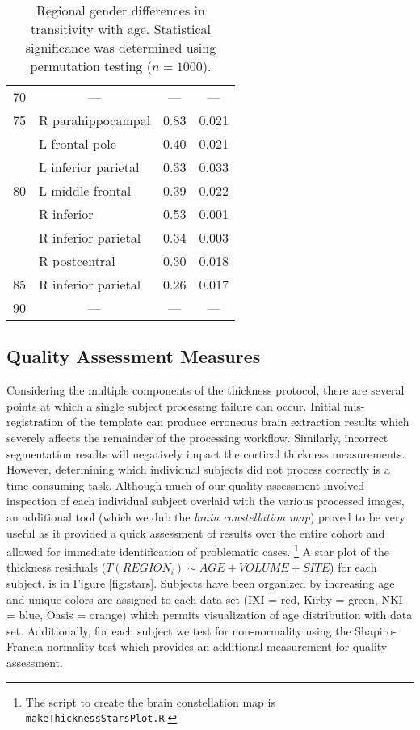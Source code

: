 \begin{table}[htb]
\begin{tabular}{c l c c}
\rowcolor{gray!40}
70 & \multicolumn{1}{c}{---} & --- & --- \\
\rowcolor{gray!20}
75 & R parahippocampal & 0.83 & 0.021 \\
\rowcolor{gray!20}
{} & L frontal pole & 0.40 & 0.021 \\
\rowcolor{gray!20}
{} & L inferior parietal & 0.33 & 0.033 \\
\rowcolor{gray!40}
80 & L middle frontal & 0.39 & 0.022 \\
\rowcolor{gray!40}
{} & R inferior & 0.53 & 0.001 \\
\rowcolor{gray!40}
{} & R inferior parietal & 0.34 & 0.003 \\
\rowcolor{gray!40}
{} & R postcentral & 0.30 & 0.018 \\
\rowcolor{gray!20}
85 & R inferior parietal & 0.26 & 0.017 \\
\rowcolor{gray!40}
90 & \multicolumn{1}{c}{---} & --- & --- \\
\bottomrule
\end{tabular}
\caption{Regional gender differences in transitivity with age.  Statistical 
significance was determined using permutation testing ($n = 1000$).
}
\label{table:genderDifference}
\end{table}

\subsection{Quality Assessment Measures}
Considering the multiple components of the thickness protocol, there are 
several points at which a single subject processing failure can occur.  Initial mis-registration of the template can produce erroneous brain extraction results
which severely affects the remainder of the processing workflow.  Similarly,
incorrect segmentation results will negatively impact the cortical thickness measurements.
However, determining which individual subjects did not process correctly is a time-consuming task.  Although much of our quality assessment involved inspection of each
individual subject overlaid with the various processed images, an additional tool (which
we dub the {\it brain constellation map}) proved to be very useful as it provided a quick
assessment of results over the entire cohort and allowed for immediate identification
of problematic cases.%
\footnote{
  The script to create the brain constellation map is  {\tt makeThicknessStarsPlot.R}.
}  
A star plot of the thickness residuals 
($T(REGION_i) \sim AGE  + VOLUME+ SITE$) for each subject.
is in Figure \ref{fig:stars}. Subjects have been organized by 
increasing age and unique colors are assigned to each 
data set (IXI = red, Kirby = green, NKI = blue, Oasis = orange)
which permits visualization of age
distribution with data set.  Additionally, for each subject we
test for non-normality using the Shapiro-Francia normality test 
\citep{royston1993} which
provides an additional measurement for quality assessment.

